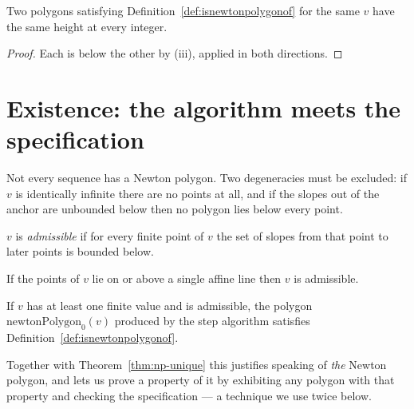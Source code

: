 \begin{theorem}[Uniqueness]
  \label{thm:np-unique}
  \leanok
  Two polygons satisfying Definition~\ref{def:isnewtonpolygonof} for the same $v$ have the same
  height at every integer.
\end{theorem}

\begin{proof}
  \leanok
  Each is below the other by (iii), applied in both directions.
\end{proof}


\section{Existence: the algorithm meets the specification}

Not every sequence has a Newton polygon.  Two degeneracies must be excluded: if $v$ is
identically infinite there are no points at all, and if the slopes out of the anchor are
unbounded below then no polygon lies below every point.

\begin{definition}
  \label{def:isadmissible}
  \leanok
  $v$ is \emph{admissible} if for every finite point of $v$ the set of slopes from that point to
  later points is bounded below.
\end{definition}

\begin{lemma}
  \label{lem:isadmissible-affine}
  \leanok
  If the points of $v$ lie on or above a single affine line then $v$ is admissible.
\end{lemma}

\begin{theorem}[Existence]
  \label{thm:np-exists}
  \leanok
  If $v$ has at least one finite value and is admissible, the polygon $\mathrm{newtonPolygon}_0(v)$
  produced by the step algorithm satisfies Definition~\ref{def:isnewtonpolygonof}.
\end{theorem}

Together with Theorem~\ref{thm:np-unique} this justifies speaking of \emph{the} Newton polygon,
and lets us prove a property of it by exhibiting any polygon with that property and checking the
specification --- a technique we use twice below.

